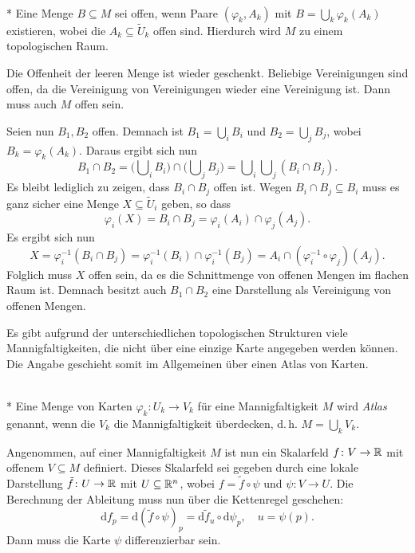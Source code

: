 \begin{theorem}\mbox{}\\*
Eine Menge $B\subseteq M$ sei offen, wenn Paare $(\varphi_k,A_k)$
mit $B=\bigcup_k\varphi_k(A_k)$ existieren, wobei die
$A_k\subseteq\tilde U_k$ offen sind.
Hierdurch wird $M$ zu einem topologischen Raum.
\end{theorem}

\noindent{}
Die Offenheit der leeren Menge ist wieder geschenkt.
Beliebige Vereinigungen sind offen, da die Vereinigung von
Vereinigungen wieder eine Vereinigung ist. Dann muss auch
$M$ offen sein.

Seien nun $B_1,B_2$ offen. Demnach ist $B_1=\bigcup_i B_i$
und $B_2=\bigcup_j B_j$, wobei $B_k=\varphi_k(A_k)$.
Daraus ergibt sich nun
\begin{equation}
B_1\cap B_2 = \Big(\bigcup\nolimits_i B_i\Big)
\cap\Big(\bigcup\nolimits_j B_j\Big)
= \bigcup\nolimits_i \bigcup\nolimits_j (B_i\cap B_j).
\end{equation}
Es bleibt lediglich zu zeigen, dass $B_i\cap B_j$ offen ist.
Wegen $B_i\cap B_j\subseteq B_i$ muss es ganz sicher eine Menge
$X\subseteq\tilde U_i$ geben, so dass
\begin{equation}
\varphi_i(X) = B_i\cap B_j = \varphi_i(A_i)\cap\varphi_j(A_j).
\end{equation}
Es ergibt sich nun
\begin{equation}
X = \varphi_i^{-1}(B_i\cap B_j)
= \varphi_i^{-1}(B_i)\cap\varphi_i^{-1}(B_j)
= A_i\cap (\varphi_i^{-1}{\circ}\varphi_j)(A_j).
\end{equation}
Folglich muss $X$ offen sein, da es die Schnittmenge von offenen
Mengen im flachen Raum ist. Demnach besitzt auch $B_1\cap B_2$
eine Darstellung als Vereinigung von offenen Mengen.\;\qedsymbol

Es gibt aufgrund der unterschiedlichen topologischen Strukturen
viele Mannigfaltigkeiten, die nicht über eine einzige Karte
angegeben werden können. Die Angabe geschieht somit im
Allgemeinen über einen Atlas von Karten.

\begin{definition}[Atlas]\mbox{}\\*
Eine Menge von Karten $\varphi_k\colon U_k\to V_k$ für eine
Mannigfaltigkeit $M$ wird \emph{Atlas} genannt, wenn die
$V_k$ die Mannigfaltigkeit überdecken, d.\,h. $M=\bigcup_k V_k$.
\end{definition}

\noindent
Angenommen, auf einer Mannigfaltigkeit $M$ ist nun ein Skalarfeld
$f\colon V\to\mathbb R$ mit offenem $V\subseteq M$ definiert. Dieses
Skalarfeld sei gegeben durch eine lokale Darstellung
$\tilde f\colon U\to\mathbb R$ mit $U\subseteq\mathbb R^n$, wobei
$f=\tilde f\circ\psi$ und $\psi\colon V\to U$.
Die Berechnung der Ableitung muss nun über die Kettenregel
geschehen:
\begin{equation}
\mathrm df_p = \mathrm d(\tilde f\circ\psi)_p
= \mathrm d\tilde f_u\circ\mathrm d\psi_p,
\quad u = \psi(p).
\end{equation}
Dann muss die Karte $\psi$ differenzierbar sein.

